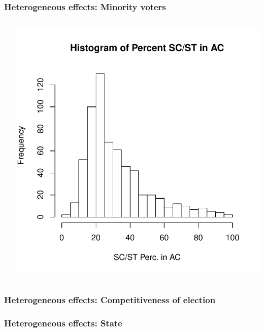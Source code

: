 \documentclass{beamer}
\begin{document}
\begin{frame}
\frametitle{Heterogeneous effects: Minority voters}
\begin{columns}[T] %
\begin{column}{.48\textwidth}
\end{column}%
\hfill%
\begin{column}{.48\textwidth}
\vspace{-10pt}
\includegraphics[scale=.45]{../Figures/histscstpc.pdf}
\end{column}%
\end{columns}
\end{frame}



\begin{frame}
\frametitle{Heterogeneous effects: Competitiveness of election}


\end{frame}


\begin{frame}
\frametitle{Heterogeneous effects: State}
\end{frame}
\end{document}
